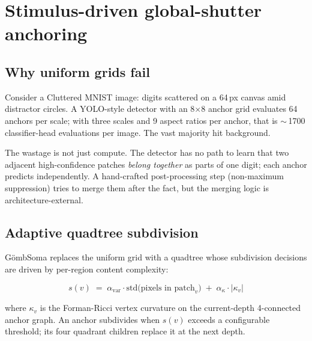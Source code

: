 \documentclass[11pt,a4paper]{article}
\newcommand{\GS}{G\"ombSoma}
\begin{document}
\section{Stimulus-driven global-shutter anchoring}

\subsection{Why uniform grids fail}

Consider a Cluttered MNIST image: digits scattered on a 64\,px
canvas amid distractor circles. A YOLO-style detector with an
8$\times$8 anchor grid evaluates 64 anchors per scale; with three
scales and 9 aspect ratios per anchor, that is $\sim$\,1700
classifier-head evaluations per image. The vast majority hit
background.

The wastage is not just compute. The detector has no path to learn
that two adjacent high-confidence patches \emph{belong together}
as parts of one digit; each anchor predicts independently. A
hand-crafted post-processing step (non-maximum suppression) tries
to merge them after the fact, but the merging logic is
architecture-external.

\subsection{Adaptive quadtree subdivision}

\GS{} replaces the uniform grid with a quadtree whose subdivision
decisions are driven by per-region content complexity:

\begin{equation}
s(v) \;=\; \alpha_{\text{var}} \cdot \mathrm{std}\bigl(\text{pixels in patch}_v\bigr)
        \;+\; \alpha_\kappa \cdot \lvert \kappa_v \rvert
\end{equation}

where $\kappa_v$ is the Forman-Ricci vertex curvature on the
current-depth 4-connected anchor graph. An anchor subdivides when
$s(v)$ exceeds a configurable threshold; its four quadrant children
replace it at the next depth.
\end{document}
